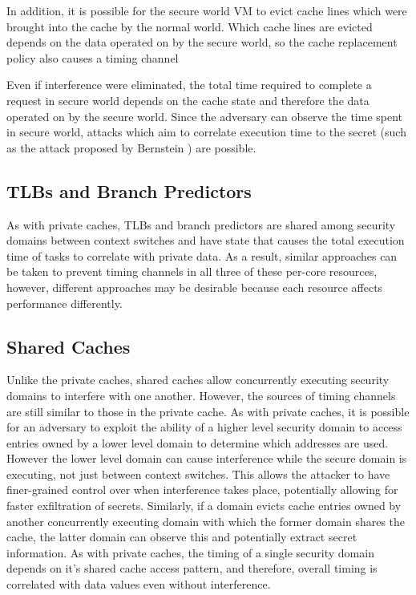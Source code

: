 In addition, it is possible for the secure world VM to evict cache lines which 
were brought into the cache by the normal world.  Which cache lines are evicted 
depends on the data operated on by the secure world, so the cache replacement 
policy also causes a timing channel

Even if interference were eliminated, the total time required to complete a 
request in secure world depends on the cache state and therefore the data 
operated on by the secure world. Since the adversary can observe the time spent 
in secure world, attacks which aim to correlate execution time to the secret 
(such as the attack proposed by Bernstein \cite{bernstein}) are possible.

\subsection{TLBs and Branch Predictors}
As with private caches, TLBs and branch predictors are shared among security 
domains between context switches and have state that causes the total execution 
time of tasks to correlate with private data. As a result, similar approaches 
can be taken to prevent timing channels in all three of these per-core 
resources, however, different approaches may be desirable because each resource 
affects performance differently.

\subsection{Shared Caches}
Unlike the private caches, shared caches allow concurrently executing security 
domains to interfere with one another. However, the sources of timing channels 
are still similar to those in the private cache. As with private caches, it is 
possible for an adversary to exploit the ability of a higher level security 
domain to access entries owned by a lower level domain to determine which 
addresses are used. However the lower level domain can cause interference while 
the secure domain is executing, not just between context switches. This allows 
the attacker to have finer-grained control over when interference takes place, 
potentially allowing for faster exfiltration of secrets. Similarly, if a domain 
evicts cache entries owned by another concurrently executing domain with which 
the former domain shares the cache, the latter domain can observe this and 
potentially extract secret information. As with private caches, the timing of a 
single security domain depends on it's shared cache access pattern, and 
therefore, overall timing is correlated with data values even without 
interference.

